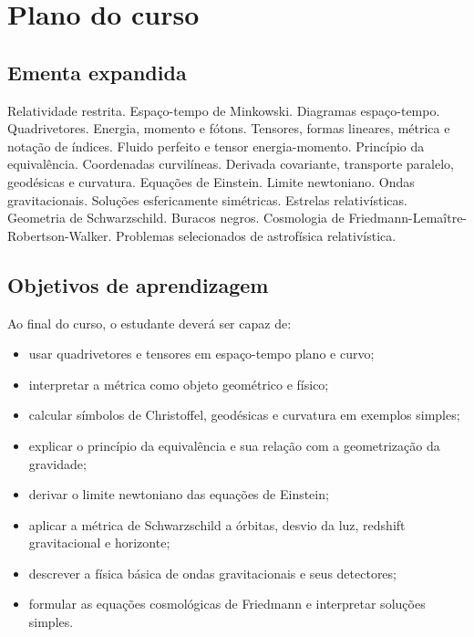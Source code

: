 \documentclass[12pt,a4paper,oneside]{book}
\theoremstyle{rgplain}
\theoremstyle{rgremark}
\begin{document}
\tableofcontents

\mainmatter

\chapter*{Plano do curso}
{}

\section*{Ementa expandida}
{}

Relatividade restrita. Espaço-tempo de Minkowski. Diagramas espaço-tempo.
Quadrivetores. Energia, momento e fótons. Tensores, formas lineares, métrica e
notação de índices. Fluido perfeito e tensor energia-momento. Princípio da
equivalência. Coordenadas curvilíneas. Derivada covariante, transporte paralelo,
geodésicas e curvatura. Equações de Einstein. Limite newtoniano. Ondas
gravitacionais. Soluções esfericamente simétricas. Estrelas relativísticas.
Geometria de Schwarzschild. Buracos negros. Cosmologia de Friedmann-Lemaître-
Robertson-Walker. Problemas selecionados de astrofísica relativística.

\section*{Objetivos de aprendizagem}
{}

Ao final do curso, o estudante deverá ser capaz de:

\begin{itemize}
  \item usar quadrivetores e tensores em espaço-tempo plano e curvo;
  \item interpretar a métrica como objeto geométrico e físico;
  \item calcular símbolos de Christoffel, geodésicas e curvatura em exemplos simples;
  \item explicar o princípio da equivalência e sua relação com a geometrização da gravidade;
  \item derivar o limite newtoniano das equações de Einstein;
  \item aplicar a métrica de Schwarzschild a órbitas, desvio da luz, redshift gravitacional e horizonte;
  \item descrever a física básica de ondas gravitacionais e seus detectores;
  \item formular as equações cosmológicas de Friedmann e interpretar soluções simples.
\end{itemize}
\end{document}
